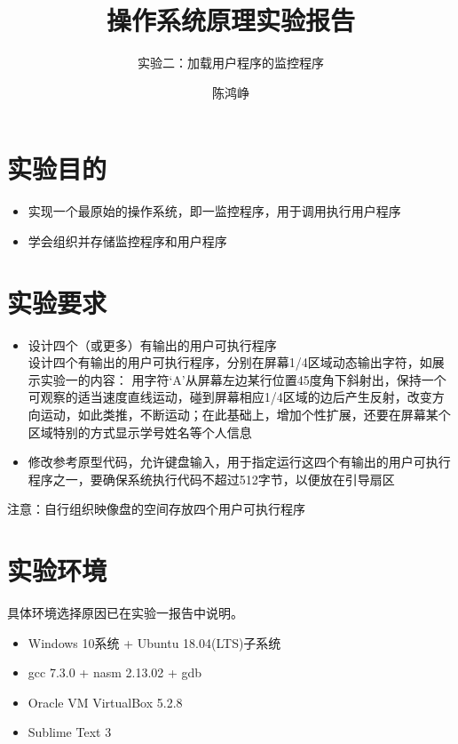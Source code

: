 \documentclass[logo,reportComp]{thesis}
\title{操作系统原理实验报告}
\subtitle{实验二：加载用户程序的监控程序}
\author{陈鸿峥}
\begin{document}
\maketitle

\section{实验目的}
\begin{itemize}
	\item 实现一个最原始的操作系统，即一监控程序，用于调用执行用户程序
	\item 学会组织并存储监控程序和用户程序
\end{itemize}

\section{实验要求}
\begin{itemize}
	\item 设计四个（或更多）有输出的用户可执行程序\\
	设计四个有输出的用户可执行程序，分别在屏幕1/4区域动态输出字符，如展示实验一的内容：
	用字符‘A’从屏幕左边某行位置45度角下斜射出，保持一个可观察的适当速度直线运动，碰到屏幕相应1/4区域的边后产生反射，改变方向运动，如此类推，不断运动；在此基础上，增加个性扩展，还要在屏幕某个区域特别的方式显示学号姓名等个人信息
	\item 修改参考原型代码，允许键盘输入，用于指定运行这四个有输出的用户可执行程序之一，要确保系统执行代码不超过512字节，以便放在引导扇区
\end{itemize}
注意：自行组织映像盘的空间存放四个用户可执行程序

\section{实验环境}
具体环境选择原因已在实验一报告中说明。
\begin{itemize}
	\item Windows 10系统 + Ubuntu 18.04(LTS)子系统
	\item gcc 7.3.0 + nasm 2.13.02 + gdb
	\item Oracle VM VirtualBox 5.2.8
	\item Sublime Text 3
\end{itemize}
\end{document}
